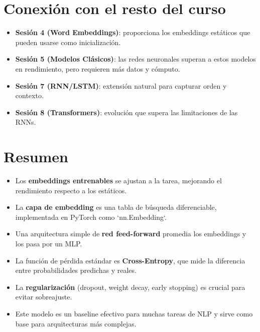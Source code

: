 \documentclass[12pt,a4paper,openany,oneside]{book}
\begin{document}
\section{Conexión con el resto del curso}
\begin{itemize}
    \item \textbf{Sesión 4 (Word Embeddings)}: proporciona los embeddings estáticos que pueden usarse como inicialización.
    \item \textbf{Sesión 5 (Modelos Clásicos)}: las redes neuronales superan a estos modelos en rendimiento, pero requieren más datos y cómputo.
    \item \textbf{Sesión 7 (RNN/LSTM)}: extensión natural para capturar orden y contexto.
    \item \textbf{Sesión 8 (Transformers)}: evolución que supera las limitaciones de las RNNs.
\end{itemize}

\section{Resumen}
\begin{itemize}
    \item Los \textbf{embeddings entrenables} se ajustan a la tarea, mejorando el rendimiento respecto a los estáticos.
    \item La \textbf{capa de embedding} es una tabla de búsqueda diferenciable, implementada en PyTorch como `nn.Embedding`.
    \item Una arquitectura simple de \textbf{red feed-forward} promedia los embeddings y los pasa por un MLP.
    \item La función de pérdida estándar es \textbf{Cross-Entropy}, que mide la diferencia entre probabilidades predichas y reales.
    \item La \textbf{regularización} (dropout, weight decay, early stopping) es crucial para evitar sobreajuste.
    \item Este modelo es un baseline efectivo para muchas tareas de NLP y sirve como base para arquitecturas más complejas.
\end{itemize}
\end{document}
